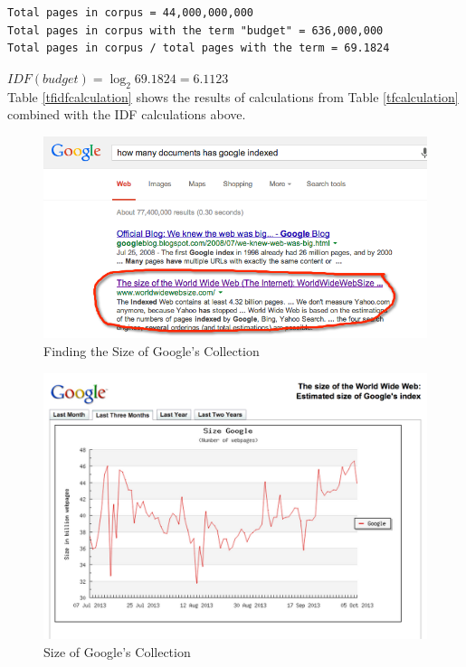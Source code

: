 \documentclass{article}
\begin{document}
\begin{verbatim}
Total pages in corpus = 44,000,000,000
Total pages in corpus with the term "budget" = 636,000,000
Total pages in corpus / total pages with the term = 69.1824
\end{verbatim}
$IDF(budget)= \log_2 69.1824 = 6.1123$ \\

Table \ref{tfidfcalculation} shows the results of calculations from Table \ref{tfcalculation} combined with the IDF calculations above.

\begin{figure}[H]
\centering
\includegraphics[scale=0.50]{q2/findinggooglesizecollection}
\caption{Finding the Size of Google's Collection}
\label{googlesize}
\end{figure}

\begin{figure}[H]
\centering
\includegraphics[scale=0.25]{q2/sizeofgooglecollection}
\caption{Size of Google's Collection}
\label{googlesizegraph}
\end{figure}
\end{document}
